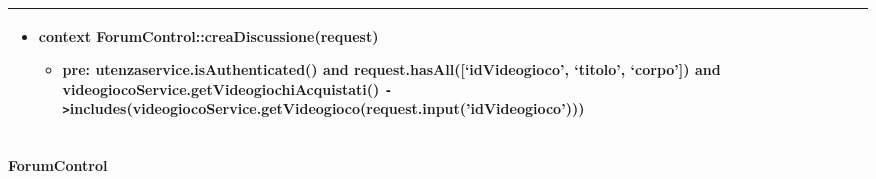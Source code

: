 \begin{tabular}{|| l | p{34em} ||}
\begin{itemize}[leftmargin=*]
	\item \textbf{context} ForumControl::creaDiscussione(request)
	\begin{itemize}
		\item[ ] \textbf{pre:} utenzaservice.isAuthenticated()
		and request.hasAll([‘idVideogioco’, ‘titolo’, ‘corpo’])
		and videogiocoService.getVideogiochiAcquistati() \verb|->|includes(\newline videogiocoService.getVideogioco(request.input('idVideogioco')))
	\end{itemize}

\end{itemize}\\
\hline
\end{tabular}

\newpage
\paragraph{ForumControl}
